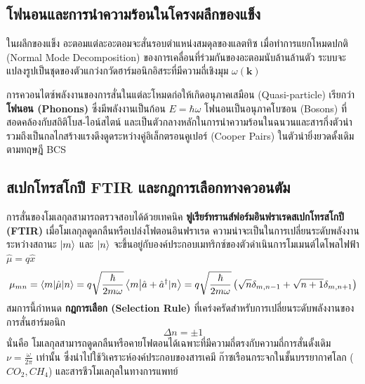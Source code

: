 \subsection{โฟนอนและการนำความร้อนในโครงผลึกของแข็ง}
ในผลึกของแข็ง อะตอมแต่ละอะตอมจะสั่นรอบตำแหน่งสมดุลของแลตทิซ เมื่อทำการแยกโหมดปกติ (Normal Mode Decomposition) ของการเคลื่อนที่ร่วมกันของอะตอมนับล้านล้านตัว ระบบจะแปลงรูปเป็นชุดของตัวแกว่งกวัดฮาร์มอนิกอิสระที่มีความถี่เชิงมุม $\omega(\mathbf{k})$

การควอนไตซ์พลังงานของการสั่นในแต่ละโหมดก่อให้เกิดอนุภาคเสมือน (Quasi-particle) เรียกว่า \textbf{โฟนอน (Phonons)} ซึ่งมีพลังงานเป็นก้อน $E = \hbar\omega$ โฟนอนเป็นอนุภาคโบซอน (Bosons) ที่สอดคล้องกับสถิติโบส-ไอน์สไตน์ และเป็นตัวกลางหลักในการนำความร้อนในฉนวนและสารกึ่งตัวนำ รวมถึงเป็นกลไกสร้างแรงดึงดูดระหว่างคู่อิเล็กตรอนคูเปอร์ (Cooper Pairs) ในตัวนำยิ่งยวดดั้งเดิมตามทฤษฎี BCS

\subsection{สเปกโทรสโกปี FTIR และกฎการเลือกทางควอนตัม}
การสั่นของโมเลกุลสามารถตรวจสอบได้ด้วยเทคนิค \textbf{ฟูเรียร์ทรานส์ฟอร์มอินฟราเรดสเปกโทรสโกปี (FTIR)} เมื่อโมเลกุลดูดกลืนหรือเปล่งโฟตอนอินฟราเรด ความน่าจะเป็นในการเปลี่ยนระดับพลังงานระหว่างสถานะ $\ket{m}$ และ $\ket{n}$ จะขึ้นอยู่กับองค์ประกอบเมทริกซ์ของตัวดำเนินการโมเมนต์ไดโพลไฟฟ้า $\hat{\mu} = q\hat{x}$
\begin{equation}
\mu_{mn} = \braket{m}{\hat{\mu}|n} = q \sqrt{\frac{\hbar}{2m\omega}} \braket{m}{\hat{a} + \hat{a}^\dagger|n} = q \sqrt{\frac{\hbar}{2m\omega}}\left( \sqrt{n}\delta_{m, n-1} + \sqrt{n+1}\delta_{m, n+1} \right)
\end{equation}
สมการนี้กำหนด \textbf{กฎการเลือก (Selection Rule)} ที่เคร่งครัดสำหรับการเปลี่ยนระดับพลังงานของการสั่นฮาร์มอนิก
\begin{equation}
\Delta n = \pm 1
\end{equation}
นั่นคือ โมเลกุลสามารถดูดกลืนหรือคายโฟตอนได้เฉพาะที่มีความถี่ตรงกับความถี่การสั่นดั้งเดิม $\nu = \frac{\omega}{2\pi}$ เท่านั้น ซึ่งนำไปใช้วิเคราะห์องค์ประกอบของสารเคมี ก๊าซเรือนกระจกในชั้นบรรยากาศโลก ($CO_2, CH_4$) และสารชีวโมเลกุลในทางการแพทย์

